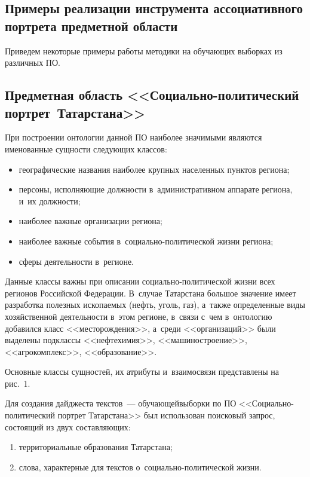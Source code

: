 \begin{multicols}{2}
    \section{Примеры реализации инструмента ассоциативного портрета предметной области}

     Приведем некоторые примеры работы методики на обучающих
выборках из различных ПО.

     \subsection{Предметная область <<Со\-ци\-аль\-но-по\-ли\-ти\-че\-ский
портрет~Татарстана>>}

     При построении онтологии данной ПО наиболее
значимыми являются именованные сущности следующих классов:
     \begin{itemize}
\item географические названия наиболее крупных населенных пунктов
региона;
\item персоны, исполняющие должности в~административном аппарате
региона, и~их должности;
\item наиболее важные организации региона;
\item наиболее важные события в~со\-ци\-аль\-но-по\-ли\-ти\-че\-ской
жизни региона;
\item сферы деятельности в~регионе.
\end{itemize}

     Данные классы важны при описании со\-ци\-аль\-но-по\-ли\-ти\-че\-ской жизни
всех регионов Российской Федерации. В~случае Татарстана большое
значение имеет разработка полезных ископаемых (нефть, уголь, газ), а~также
определенные виды хозяйственной деятельности в~этом регионе, в~связи с~чем в~онтологию добавился класс <<месторождения>>, а~среди
<<организаций>> были выделены подклассы <<нефтехимия>>,
<<машиностроение>>, <<агрокомплекс>>, <<образование>>.

     Основные классы сущностей, их атрибуты и~взаимосвязи представлены
на рис.~1.



     Для создания дайджеста текстов~--- обучающей\linebreak выборки по ПО
<<Социально-политический портрет Татарстана>> был использован
поисковый запрос, состоящий из двух составляющих:
\begin{enumerate}[(1)]
\item территориальные
образования Татарстана;
\item слова, характер\-ные для текстов о~со\-ци\-аль\-но-по\-ли\-ти\-че\-ской жиз\-ни.
    \end{enumerate}


\end{multicols}
